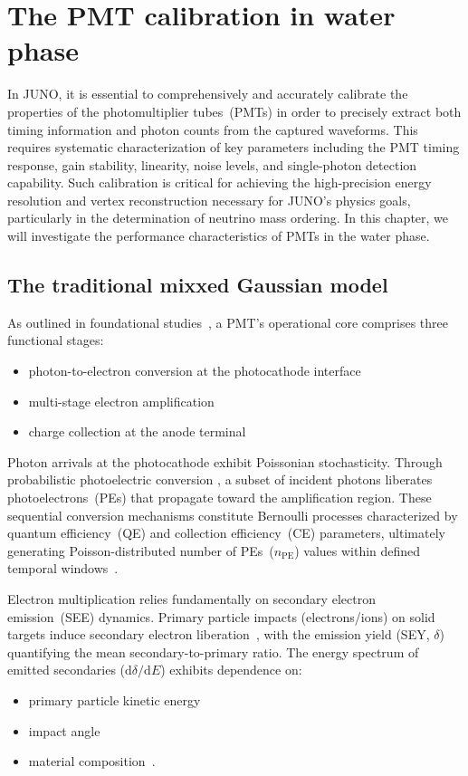 \chapter{The PMT calibration in water phase}\label{sec:Introduction}
In JUNO, it is essential to comprehensively and accurately calibrate the properties of the photomultiplier tubes~(PMTs) in order to precisely extract both timing information and photon counts from the captured waveforms. This requires systematic characterization of key parameters including the PMT timing response, gain stability, linearity, noise levels, and single-photon detection capability. Such calibration is critical for achieving the high-precision energy resolution and vertex reconstruction necessary for JUNO's physics goals, particularly in the determination of neutrino mass ordering. In this chapter, we will investigate the performance characteristics of PMTs in the water phase.

\section{The traditional mixxed Gaussian model}
As outlined in foundational studies~\cite{1955Scintillation}, a PMT's operational core comprises three functional stages:
\begin{itemize}
	\item photon-to-electron conversion at the photocathode interface
	\item multi-stage electron amplification
	\item charge collection at the anode terminal
\end{itemize}

Photon arrivals at the photocathode exhibit Poissonian stochasticity. Through probabilistic photoelectric conversion \cite{2016Optimization}, a subset of incident photons liberates photoelectrons~(PEs) that propagate toward the amplification region. These sequential conversion mechanisms constitute Bernoulli processes characterized by quantum efficiency~(QE) and collection efficiency~(CE) parameters, ultimately generating Poisson-distributed number of PEs~($n_{\mathrm{PE}}$) values within defined temporal windows~\cite{1994Absolute}.

Electron multiplication relies fundamentally on secondary electron emission~(SEE) dynamics. Primary particle impacts (electrons/ions) on solid targets induce secondary electron liberation~\cite{2016Secondary}, with the emission yield (SEY, $\delta$) quantifying the mean secondary-to-primary ratio. The energy spectrum of emitted secondaries ($\mathrm{d}\delta/\mathrm{d}E$) exhibits dependence on:
\begin{itemize}
	\item primary particle kinetic energy
	\item impact angle
	\item material composition~\cite{2002Probabilistic}.
\end{itemize}

